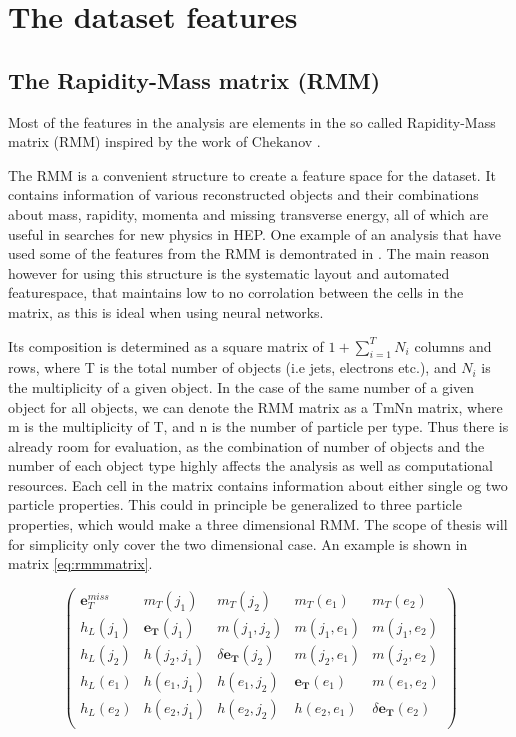 \section{The dataset features}

\subsection*{The Rapidity-Mass matrix (RMM) }\label{sec:rmm}
Most of the features in the analysis are elements in the so called Rapidity-Mass matrix (RMM)  inspired by the work of Chekanov \cite{Chekanov_2019}.
\par
The RMM is a convenient structure to create a feature space for the dataset. It contains information of various reconstructed objects and their combinations 
about mass, rapidity, momenta and missing transverse energy, all of which are useful in searches for new physics\cite{Chekanov_2021} in HEP. 
One example of an analysis that have used some of the features from the RMM is demontrated in \cite{Santos_2017}. The main reason however 
for using this structure is the systematic layout and automated featurespace, that maintains low to no corrolation between the cells in the 
matrix, as this is ideal when using neural networks.
\par
Its composition is determined as a square matrix of $1 + \sum_{i=1}^{T}N_i$ columns and rows, where T is the total number of objects (i.e jets, 
electrons etc.), and $N_i$ is the multiplicity of a given object. In the case of the same number of a given object for all objects, we can 
denote the RMM matrix as a TmNn matrix, where m is the multiplicity of T, and n is the number of particle per type. Thus there is already 
room for evaluation, as the combination of number of objects and the number of each object type highly affects the analysis as well as 
computational resources. Each cell in the matrix contains information about either single og two particle properties. This could in principle be
generalized to three particle properties, which would make a three dimensional RMM. The scope of thesis will for simplicity only cover the 
two dimensional case. An example is 
shown in matrix \ref{eq:rmmmatrix}.

\begin{equation}\label{eq:rmmmatrix}
\begin{pmatrix}
    \boldsymbol{e}_{T}^{miss} & m_T(j_1) & m_T(j_2) &  m_T(e_1) &  m_T(e_2)\\
    h_L(j_1) & \boldsymbol{e_T}(j_1) & m(j_1, j_2) & m(j_1, e_1) & m(j_1, e_2)\\
    h_L(j_2) & h(j_2, j_1) & \delta \boldsymbol{e_T}(j_2)& m(j_2, e_1) & m(j_2, e_2)\\
    h_L(e_1) & h(e_1, j_1) & h(e_1, j_2) & \boldsymbol{e_T}(e_1) & m(e_1, e_2)\\
    h_L(e_2) & h(e_2, j_1) & h(e_2, j_2) & h(e_2, e_1) & \delta \boldsymbol{e_T}(e_2)\\
\end{pmatrix}
\end{equation}

